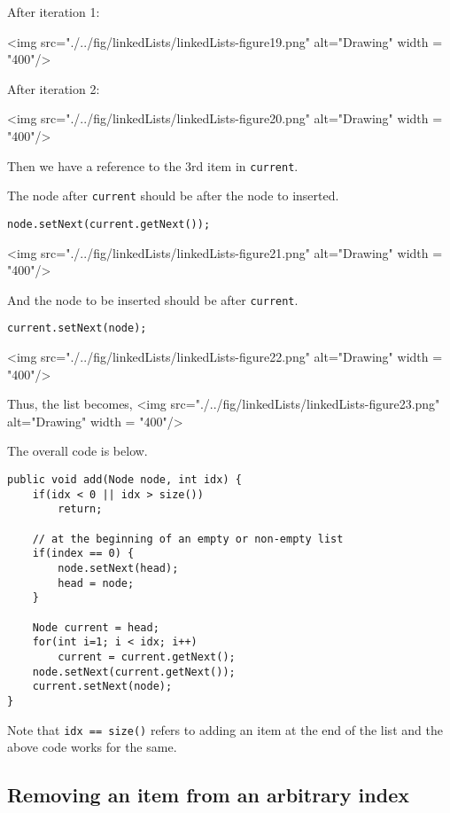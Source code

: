 After iteration 1:
\vskip 0.5cm

<img src="./../fig/linkedLists/linkedLists-figure19.png" alt="Drawing" width = "400"/>

After iteration 2:
\vskip 0.5cm

<img src="./../fig/linkedLists/linkedLists-figure20.png" alt="Drawing" width = "400"/>

Then we have a reference to the 3rd item in \texttt{current}.

The node after \texttt{current} should be after the node to inserted.

\begin{lstlisting}
node.setNext(current.getNext());
\end{lstlisting}

<img src="./../fig/linkedLists/linkedLists-figure21.png" alt="Drawing" width = "400"/>

And the node to be inserted should be after \texttt{current}.

\begin{lstlisting}
current.setNext(node);
\end{lstlisting}

<img src="./../fig/linkedLists/linkedLists-figure22.png" alt="Drawing" width = "400"/>

Thus, the list becomes,
\vskip 0.5cm
<img src="./../fig/linkedLists/linkedLists-figure23.png" alt="Drawing" width = "400"/>

\newpage

The overall code is below.

\begin{lstlisting}
public void add(Node node, int idx) {
	if(idx < 0 || idx > size()) 
		return;
	
	// at the beginning of an empty or non-empty list
	if(index == 0) { 
		node.setNext(head);
		head = node;
	}
	
	Node current = head;
	for(int i=1; i < idx; i++)
		current = current.getNext();
	node.setNext(current.getNext());
	current.setNext(node);
}
\end{lstlisting}

Note that \texttt{idx == size()} refers to adding an item at the end of the list and the above code works for the same.

\newpage

\subsection{Removing an item from an arbitrary index}

